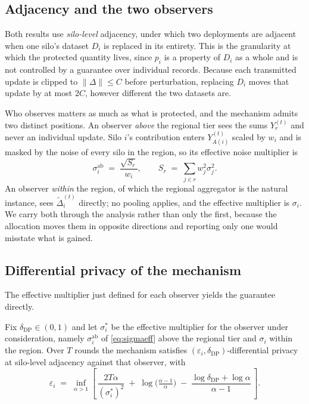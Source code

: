 \documentclass[acmsmall,screen,review,anonymous]{acmart}
\theoremstyle{acmdefinition}%
\begin{document}
\subsection{Adjacency and the two observers}

Both results use \emph{silo-level} adjacency, under which two deployments are
adjacent when one silo's dataset $D_i$ is replaced in its entirety. This is the
granularity at which the protected quantity lives, since $p_i$ is a property of
$D_i$ as a whole and is not controlled by a guarantee over individual records.
Because each transmitted update is clipped to $\|\Delta\| \le C$ before
perturbation, replacing $D_i$ moves that update by at most $2C$, however different
the two datasets are.

Who observes matters as much as what is protected, and the mechanism admits two
distinct positions. An observer \emph{above} the regional tier sees the sums
$Y_r^{(t)}$ and never an individual update. Silo $i$'s contribution enters
$Y_{A(i)}^{(t)}$ scaled by $w_i$ and is masked by the noise of every silo in the
region, so its effective noise multiplier is
\begin{equation}
\sigma^{\mathrm{ab}}_i \;=\; \frac{\sqrt{S_r}}{w_i},
\qquad S_r \;=\; \sum_{j \in r} w_j^2 \sigma_j^2 .
\label{eq:sigmaeff}
\end{equation}
An observer \emph{within} the region, of which the regional aggregator is the
natural instance, sees $\tilde{\Delta}_i^{(t)}$ directly; no pooling applies, and
the effective multiplier is $\sigma_i$. We carry both through the analysis rather
than only the first, because the allocation moves them in opposite directions and
reporting only one would misstate what is gained.

\subsection{Differential privacy of the mechanism}

The effective multiplier just defined for each observer yields the guarantee
directly.

\begin{theorem}
\label{thm:dp}
Fix $\delta_{\mathrm{DP}} \in (0,1)$ and let $\sigma^{\ast}_i$ be the effective
multiplier for the observer under consideration, namely $\sigma^{\mathrm{ab}}_i$
of \eqref{eq:sigmaeff} above the regional tier and $\sigma_i$ within the region.
Over $T$ rounds the mechanism satisfies $(\varepsilon_i,
\delta_{\mathrm{DP}})$-differential privacy at silo-level adjacency against that
observer, with
\begin{equation}
\varepsilon_i \;=\; \inf_{\alpha > 1}
\left[\, \frac{2 T \alpha}{(\sigma^{\ast}_i)^2}
\;+\; \log\!\Big(\tfrac{\alpha - 1}{\alpha}\Big)
\;-\; \frac{\log \delta_{\mathrm{DP}} + \log \alpha}{\alpha - 1} \,\right].
\label{eq:dpeps}
\end{equation}
\end{theorem}
\end{document}
